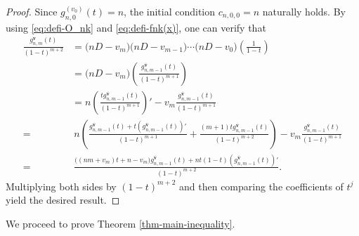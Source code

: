 \documentclass[12pt]{article}
\numberwithin{equation}{section}
\begin{document}
\begin{proof}
Since $g^{(v_0)}_{n,0}(t)=n$, the initial condition $c_{n,0,0}=n$ naturally holds.
By using \eqref{eq:defi-O_nk} and \eqref{eq:defi-fnk(x)}, one can verify that 
\begin{align*}
\frac{g^{\mathbf{v}}_{n,m}(t)}{(1-t)^{m+2}}&=\big(nD-v_{m}\big)\big(nD-v_{m-1}\big)\cdots \big(nD-v_{0}\big)\left(\frac{1}{1-t}\right)\\[5pt]
&=\big(nD-v_{m}\big)\left(\frac{g^{\overline{\mathbf{v}}}_{n,m-1}(t)}{(1-t)^{m+1}}\right)\\[5pt]
&=n\left(\frac{tg^{\overline{\mathbf{v}}}_{n,m-1}(t)}{(1-t)^{m+1}}\right)'-v_{m}\frac{g^{\overline{\mathbf{v}}}_{n,m-1}(t)}{(1-t)^{m+1}}\\[5pt]
=&\ n\left(\frac{g^{\overline{\mathbf{v}}}_{n,m-1}(t)+t (g^{\overline{\mathbf{v}}}_{n,m-1}(t))'}{(1-t)^{m+1}}+\frac{(m+1)t g^{\overline{\mathbf{v}}}_{n,m-1}(t)}{(1-t)^{m+2}}\right)
   -v_{m}\frac{g^{\overline{\mathbf{v}}}_{n,m-1}(t)}{(1-t)^{m+1}}\\[5pt]
=&\ \frac{\big((nm+v_{m})t+n-v_{m}\big)g^{\overline{\mathbf{v}}}_{n,m-1}(t)+nt(1-t) (g^{\overline{\mathbf{v}}}_{n,m-1}(t))'}{(1-t)^{m+2}}.
\end{align*}
Multiplying both sides by $(1-t)^{m+2}$ and then comparing the coefficients of $t^j$ yield the desired result.
\end{proof}
We proceed to prove Theorem \ref{thm-main-inequality}. 
\end{document}
